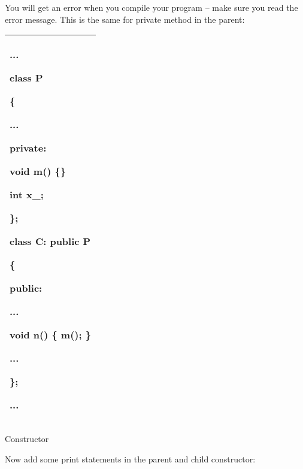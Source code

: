 \documentclass[
]{article}
\begin{document}
You will get an error when you compile your program -- make sure you
read the error message. This is the same for private method in the
parent:

\begin{longtable}[]{@{}l@{}}
\toprule
\endhead
\begin{minipage}[t]{0.97\columnwidth}\raggedright
...

class P

\{

...

private:

\textbf{void m() \{\}}

int x\_;

\};

class C: public P

\{

public:

...

\textbf{void n() \{ m(); \}}

...

\};

...\strut
\end{minipage}\tabularnewline
\bottomrule
\end{longtable}

Constructor

Now add some print statements in the parent and child constructor:
\end{document}

